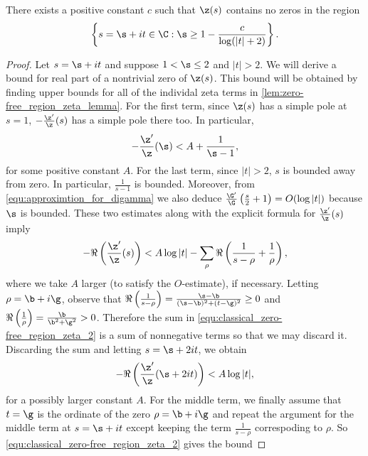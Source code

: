       \begin{theorem}
        There exists a positive constant $c$ such that $\z(s)$ contains no zeros in the region
        \[
          \left\{s = \s+it \in \C:\s \ge 1-\frac{c}{\log(|t|+2)}\right\}.
        \]
      \end{theorem}
      \begin{proof}
        Let $s = \s+it$ and suppose $1 < \s \le 2$ and $|t| > 2$. We will derive a bound for real part of a nontrivial zero of $\z(s)$. This bound will be obtained by finding upper bounds for all of the individal zeta terms in \cref{lem:zero-free_region_zeta_lemma}. For the first term, since $\z(s)$ has a simple pole at $s = 1$, $-\frac{\z'}{\z}(s)$ has a simple pole there too. In particular,
        \begin{equation}\label{equ:classical_zero-free_region_zeta_1}
          -\frac{\z'}{\z}(\s) < A+\frac{1}{\s-1},
        \end{equation}
        for some positive constant $A$. For the last term, since $|t| > 2$, $s$ is bounded away from zero. In particular, $\frac{1}{s-1}$ is bounded. Moreover, from \cref{equ:approximtion_for_digamma} we also deduce $\frac{\G'}{\G}\left(\frac{s}{2}+1\right) = O(\log|t|)$ because $\s$ is bounded. These two estimates along with the explicit formula for $\frac{\z'}{\z}(s)$ imply
        \begin{equation}\label{equ:classical_zero-free_region_zeta_2}
          -\Re\left(\frac{\z'}{\z}(s)\right) < A\log|t|-\sum_{\rho}\Re\left(\frac{1}{s-\rho}+\frac{1}{\rho}\right),
        \end{equation}
        where we take $A$ larger (to satisfy the $O$-estimate), if necessary. Letting $\rho = \b+i\g$, observe that $\Re\left(\frac{1}{s-\rho}\right) = \frac{\s-\b}{(\s-\b)^{2}+(t-\g)^{2}} \ge 0$ and $\Re\left(\frac{1}{\rho}\right) = \frac{\b}{\b^{2}+\g^{2}} > 0$. Therefore the sum in \cref{equ:classical_zero-free_region_zeta_2} is a sum of nonnegative terms so that we may discard it. Discarding the sum and letting $s = \s+2it$, we obtain
        \begin{equation}\label{equ:classical_zero-free_region_zeta_3}
          -\Re\left(\frac{\z'}{\z}(\s+2it)\right) < A\log|t|,
        \end{equation}
        for a possibly larger constant $A$. For the middle term, we finally assume that $t = \g$ is the ordinate of the zero $\rho = \b+i\g$ and repeat the argument for the middle term at $s = \s+it$ except keeping the term $\frac{1}{s-\rho}$ correspoding to $\rho$. So \cref{equ:classical_zero-free_region_zeta_2} gives the bound

\end{proof}

